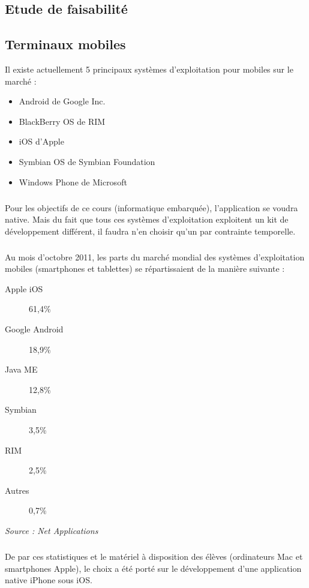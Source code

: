 \documentclass[a4paper,12pt]{report}
\begin{document}
\begin{onehalfspace}
	\chapter{Etude de faisabilité}
	
	\section{Terminaux mobiles}
	
	Il existe actuellement 5 principaux systèmes d'exploitation pour mobiles sur le marché :
	\begin{itemize}
		\item Android de Google Inc.
		\item BlackBerry OS de RIM
		\item iOS d'Apple
		\item Symbian OS de Symbian Foundation
		\item Windows Phone de Microsoft
	\end{itemize}
	
	\paragraph*{}
	Pour les objectifs de ce cours (informatique embarquée), l'application se voudra native. Mais du fait que tous ces systèmes d'exploitation exploitent un kit de développement différent, il faudra n'en choisir qu'un par contrainte temporelle.
	
	\paragraph*{}
	Au mois d'octobre 2011, les parts du marché mondial des systèmes d'exploitation mobiles (smartphones et tablettes) se répartissaient de la manière suivante :
	\begin{description}
		\item[Apple iOS] 61,4\%
		\item[Google Android] 18,9\%
		\item[Java ME] 12,8\%
		\item[Symbian] 3,5\%
		\item[RIM] 2,5\%
		\item[Autres] 0,7\%
	\end{description}
	\emph{Source : Net Applications}
	
	\paragraph*{}
	De par ces statistiques et le matériel à disposition des élèves (ordinateurs Mac et smartphones Apple), le choix a été porté sur le développement d'une application native iPhone sous iOS.
	

\end{onehalfspace}
\end{document}
